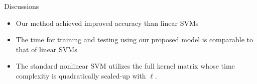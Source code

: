 \documentclass{beamer}
\begin{document}
\begin{frame}{Discussions}
\begin{itemize}
  \item Our method achieved improved accuracy than linear SVMs
  \item The time for training and testing using our proposed model is comparable to that of linear SVMs
  \item The standard nonlinear SVM utilizes the full kernel matrix whose time complexity is quadratically scaled-up with $\ell$.
\end{itemize}

\begin{table}
{\small
\caption{Comparisons of accuracy and computation time (in sec.) on three datasets. We denote our proposed Nystr\"om approximated SVM as Nystr\"om primal SVM below.}
\label{tab:mrkl_with_others}
}\end{table}
\end{frame}
\end{document}
